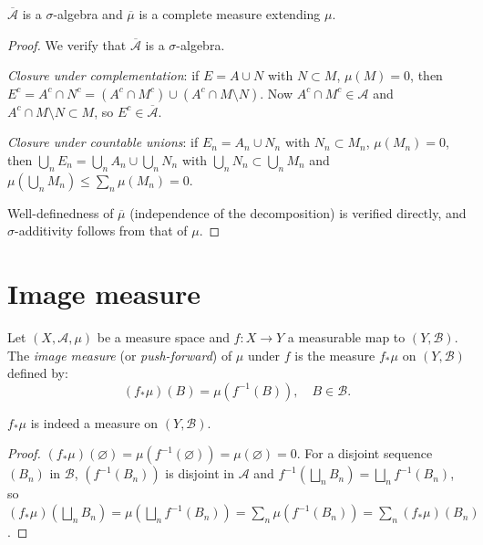 \begin{proposition}
$\overline{\mathcal{A}}$ is a $\sigma$-algebra and $\overline{\mu}$ is a complete
measure extending $\mu$.
\end{proposition}

\begin{proof}
We verify that $\overline{\mathcal{A}}$ is a $\sigma$-algebra.

\emph{Closure under complementation}: if $E = A \cup N$ with $N \subset M$,
$\mu(M) = 0$, then $E^c = A^c \cap N^c = (A^c \cap M^c) \cup (A^c \cap M
\setminus N)$. Now $A^c \cap M^c \in \mathcal{A}$ and $A^c \cap M \setminus N
\subset M$, so $E^c \in \overline{\mathcal{A}}$.

\emph{Closure under countable unions}: if $E_n = A_n \cup N_n$ with
$N_n \subset M_n$, $\mu(M_n) = 0$, then $\bigcup_n E_n = \bigcup_n A_n \cup
\bigcup_n N_n$ with $\bigcup_n N_n \subset \bigcup_n M_n$ and
$\mu(\bigcup_n M_n) \leq \sum_n \mu(M_n) = 0$.

Well-definedness of $\overline{\mu}$ (independence of the decomposition) is verified
directly, and $\sigma$-additivity follows from that of $\mu$.
\end{proof}

\section{Image measure}

\begin{definition}
Let $(X, \mathcal{A}, \mu)$ be a measure space and $f : X \to Y$ a measurable map
to $(Y, \mathcal{B})$. The \emph{image measure} (or \emph{push-forward}) of $\mu$
under $f$ is the measure $f_*\mu$ on $(Y, \mathcal{B})$ defined by:
\[
(f_*\mu)(B) = \mu(f^{-1}(B)), \quad B \in \mathcal{B}.
\]
\end{definition}

\begin{proposition}
$f_*\mu$ is indeed a measure on $(Y, \mathcal{B})$.
\end{proposition}

\begin{proof}
$(f_*\mu)(\varnothing) = \mu(f^{-1}(\varnothing)) = \mu(\varnothing) = 0$. For a
disjoint sequence $(B_n)$ in $\mathcal{B}$, $(f^{-1}(B_n))$ is disjoint in
$\mathcal{A}$ and $f^{-1}(\bigsqcup_n B_n) = \bigsqcup_n f^{-1}(B_n)$, so
$(f_*\mu)(\bigsqcup_n B_n) = \mu(\bigsqcup_n f^{-1}(B_n)) = \sum_n
\mu(f^{-1}(B_n)) = \sum_n (f_*\mu)(B_n)$.
\end{proof}

